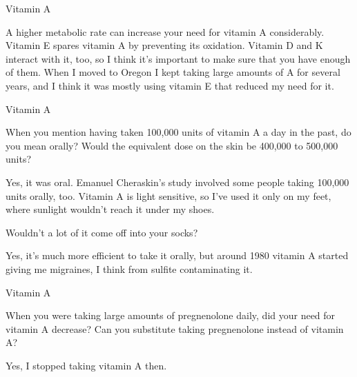 \documentclass[11pt,oneside,openany,extrafontsizes]{memoir}
\begin{document}
\begin{standalonequote}{Vitamin A}

    \begin{answer}
        A higher metabolic rate can increase your need for vitamin A considerably. Vitamin E spares vitamin A by preventing its oxidation. Vitamin D and K interact with it, too, so I think it's important to make sure that you have enough of them. When I moved to Oregon I kept taking large amounts of A for several years, and I think it was mostly using vitamin E that reduced my need for it.
    \end{answer}
\end{standalonequote}

\begin{emailexchange}{Vitamin A}

    \begin{question}
        When you mention having taken 100,000 units of vitamin A a day in the past, do you mean orally? Would the equivalent dose on the skin be 400,000 to 500,000 units?
    \end{question}

    \begin{answer}
      Yes, it was oral. Emanuel Cheraskin's study involved some people taking 100,000 units orally, too. Vitamin A is light sensitive, so I've used it only on my feet, where sunlight wouldn't reach it under my shoes.
    \end{answer}
	
    \begin{question}
        Wouldn't a lot of it come off into your socks?
    \end{question}

    \begin{answer}
      Yes, it's much more efficient to take it orally, but around 1980 vitamin A started giving me migraines, I think from sulfite contaminating it.
    \end{answer}
\end{emailexchange}

\begin{qaexchange}{Vitamin A}

    \begin{question}
        When you were taking large amounts of pregnenolone daily, did your need for vitamin A decrease? Can you substitute taking pregnenolone instead of vitamin A?
    \end{question}

    \begin{answer}
      Yes, I stopped taking vitamin A then.
    \end{answer}
\end{qaexchange}
\end{document}
